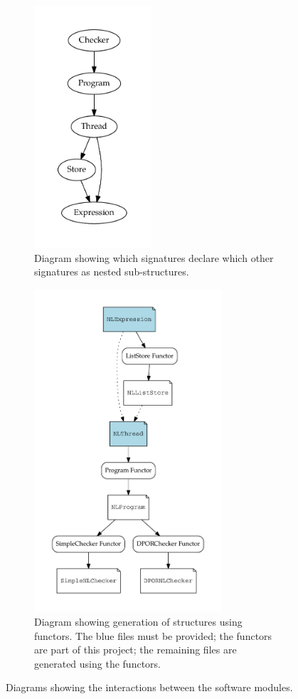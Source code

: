 \documentclass[12pt,a4paper,twoside,openright]{report}
\begin{document}
\begin{figure}
	\centering
	\begin{subfigure}{.4\textwidth}
		\centering
		\includegraphics[height=9cm]{interfaces}
		\caption{Diagram showing which signatures declare
			which other signatures as nested sub-structures.}
		\label{fig:interfaces}
	\end{subfigure}%
	\quad
	\begin{subfigure}{.5\textwidth}
		\centering
		\includegraphics[height=12cm]{functors}
		\caption{Diagram showing generation of
			structures using functors. The blue files must be provided;
			the functors are part of this project; the remaining files
			are generated using the functors.}
		\label{fig:functors}
	\end{subfigure}
	\caption{Diagrams showing the interactions between
		the software modules.}
	\label{fig:design}
\end{figure}
\end{document}
